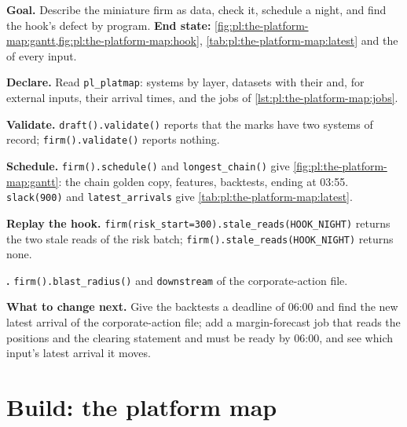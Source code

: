 \begin{tutorial}
\textbf{Goal.} Describe the miniature firm as data, check it, schedule a night, and find the hook's defect by program.
\textbf{End state:} \cref{fig:pl:the-platform-map:gantt,fig:pl:the-platform-map:hook}, \cref{tab:pl:the-platform-map:latest}
and the  of every input.
\begin{tutsteps}
\item \textbf{Declare.} Read \texttt{pl\_platmap}: systems by layer, datasets with their  and, for external
inputs, their arrival times, and the jobs of \cref{lst:pl:the-platform-map:jobs}.
\item \textbf{Validate.} \texttt{draft().validate()} reports that the marks have two systems of record; \texttt{firm().validate()}
reports nothing.
\item \textbf{Schedule.} \texttt{firm().schedule()} and \texttt{longest\_chain()} give \cref{fig:pl:the-platform-map:gantt}:
the chain golden copy, features, backtests, ending at 03:55. \texttt{slack(900)} and \texttt{latest\_arrivals} give
\cref{tab:pl:the-platform-map:latest}.
\item \textbf{Replay the hook.} \texttt{firm(risk\_start=300).stale\_reads(HOOK\_NIGHT)} returns the two stale reads of the risk
batch; \texttt{firm().stale\_reads(HOOK\_NIGHT)} returns none.
\item \textbf{.} \texttt{firm().blast\_radius()} and \texttt{downstream} of the corporate-action file.
\end{tutsteps}
\textbf{What to change next.} Give the backtests a deadline of 06:00 and find the new latest arrival of the corporate-action file;
add a margin-forecast job that reads the positions and the clearing statement and must be ready by 06:00, and see which input's
latest arrival it moves.
\end{tutorial}

\section{Build: the platform map}\label{bld:pl:the-platform-map:platmap}

